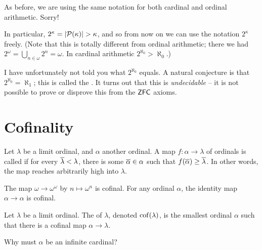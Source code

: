 \begin{abuse}
	As before, we are using the same notation for
	both cardinal and ordinal arithmetic. Sorry!
\end{abuse}

In particular, $2^\kappa = \left\lvert \mathcal P(\kappa) \right\rvert > \kappa$,
and so from now on we can use the notation $2^\kappa$ freely.
(Note that this is totally different from ordinal arithmetic;
there we had $2^\omega = \bigcup_{n\in\omega} 2^n = \omega$.
In cardinal arithmetic $2^{\aleph_0} > \aleph_0$.)

I have unfortunately not told you what $2^{\aleph_0}$ equals.
A natural conjecture is that $2^{\aleph_0} = \aleph_1$; this is called the
.
It turns out that this is \emph{undecidable} -- it is not possible
to prove or disprove this from the $\mathsf{ZFC}$ axioms.

\section{Cofinality}

\begin{definition}
	Let $\lambda$ be a limit ordinal, and $\alpha$ another ordinal.
	A map $f : \alpha \to \lambda$ of ordinals is called 
	if for every $\overline\lambda < \lambda$, there is some $\overline\alpha \in \alpha$
	such that $f(\overline\alpha) \ge \overline\lambda$.
	In other words, the map reaches arbitrarily high into $\lambda$.
\end{definition}
\begin{example}
	\listhack
	\begin{enumerate}[(a)]
		\ii The map $\omega \to \omega^\omega$ by $n \mapsto \omega^n$ is cofinal.
		\ii For any ordinal $\alpha$, the identity map $\alpha \to \alpha$ is cofinal.
	\end{enumerate}
\end{example}

\begin{definition}
	Let $\lambda$ be a limit ordinal.
	The  of $\lambda$, denoted $\operatorname{cof}(\lambda)$,
	is the smallest ordinal $\alpha$ such that there is a cofinal map
	$\alpha \to \lambda$.
\end{definition}
\begin{ques}
	Why must $\alpha$ be an infinite cardinal?
\end{ques}

